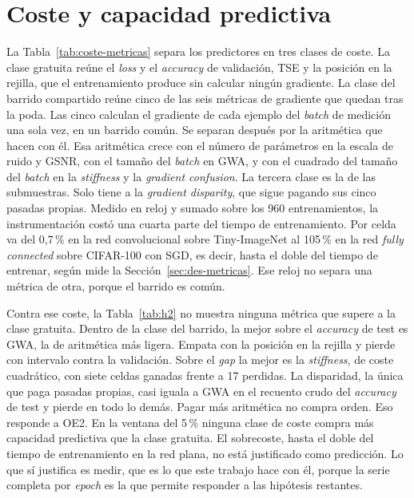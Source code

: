 \section{Coste y capacidad predictiva}
\label{sec:res-coste}

La Tabla~\ref{tab:coste-metricas} separa los predictores en tres clases de coste. La clase gratuita reúne el \emph{loss} y el \emph{accuracy} de validación, TSE y la posición en la rejilla, que el entrenamiento produce sin calcular ningún gradiente. La clase del barrido compartido reúne cinco de las seis métricas de gradiente que quedan tras la poda. Las cinco calculan el gradiente de cada ejemplo del \emph{batch} de medición una sola vez, en un barrido común. Se separan después por la aritmética que hacen con él. Esa aritmética crece con el número de parámetros en la escala de ruido y GSNR, con el tamaño del \emph{batch} en GWA, y con el cuadrado del tamaño del \emph{batch} en la \emph{stiffness} y la \emph{gradient confusion}. La tercera clase es la de las submuestras. Solo tiene a la \emph{gradient disparity}, que sigue pagando sus cinco pasadas propias. Medido en reloj y sumado sobre los 960 entrenamientos, la instrumentación costó una cuarta parte del tiempo de entrenamiento. Por celda va del 0,7\,\% en la red convolucional sobre Tiny-ImageNet al 105\,\% en la red \emph{fully connected} sobre CIFAR-100 con SGD, es decir, hasta el doble del tiempo de entrenar, según mide la Sección~\ref{sec:des-metricas}. Ese reloj no separa una métrica de otra, porque el barrido es común.

Contra ese coste, la Tabla~\ref{tab:h2} no muestra ninguna métrica que supere a la clase gratuita. Dentro de la clase del barrido, la mejor sobre el \emph{accuracy} de test es GWA, la de aritmética más ligera. Empata con la posición en la rejilla y pierde con intervalo contra la validación. Sobre el \emph{gap} la mejor es la \emph{stiffness}, de coste cuadrático, con siete celdas ganadas frente a 17 perdidas. La disparidad, la única que paga pasadas propias, casi iguala a GWA en el recuento crudo del \emph{accuracy} de test y pierde en todo lo demás. Pagar más aritmética no compra orden. Eso responde a OE2. En la ventana del 5\,\% ninguna clase de coste compra más capacidad predictiva que la clase gratuita. El sobrecoste, hasta el doble del tiempo de entrenamiento en la red plana, no está justificado como predicción. Lo que sí justifica es medir, que es lo que este trabajo hace con él, porque la serie completa por \emph{epoch} es la que permite responder a las hipótesis restantes.

